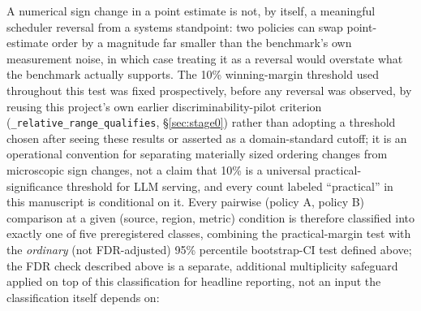 A numerical sign change in a point estimate is not, by itself, a meaningful
scheduler reversal from a systems standpoint: two policies can swap
point-estimate order by a magnitude far smaller than the benchmark's own
measurement noise, in which case treating it as a reversal would overstate
what the benchmark actually supports. The 10\% winning-margin threshold
used throughout this test was fixed prospectively, before any
reversal was observed, by reusing this project's own earlier
discriminability-pilot criterion (\texttt{\_relative\_range\_qualifies},
\S\ref{sec:stage0}) rather than adopting a threshold chosen after seeing
these results or asserted as a domain-standard cutoff; it is an
operational convention for separating materially sized ordering changes
from microscopic sign changes, not a claim that 10\% is a universal
practical-significance threshold for LLM serving, and every count labeled
``practical'' in this manuscript is conditional on it. Every pairwise (policy A, policy B)
comparison at a given (source, region, metric) condition is therefore
classified into exactly one of five preregistered classes, combining the
practical-margin test with the \emph{ordinary} (not FDR-adjusted) 95\%
percentile bootstrap-CI test defined above; the
FDR check described above is a separate, additional multiplicity
safeguard applied on top of this classification for headline reporting,
not an input the classification itself depends on:

